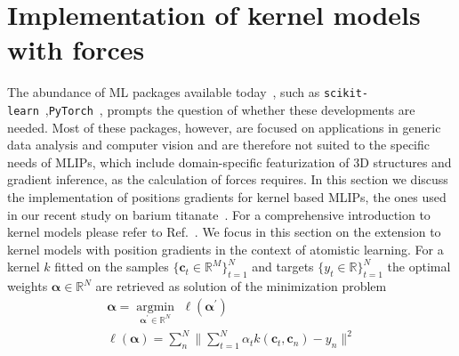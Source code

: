 \section{Implementation of kernel models with forces}
The abundance of ML packages available today~\cite{Haddad2023Artificial}, such as \texttt{scikit-learn}~\cite{pedregosa2011scikit},\linebreak \texttt{PyTorch}~\cite{NEURIPS2019_9015}, prompts the question of whether these developments are needed. %
Most of these packages, however, are focused on applications in generic data analysis and computer vision and are therefore not suited to the specific needs of MLIPs, which include domain-specific featurization of 3D structures and gradient inference, as the calculation of forces requires. %
In this section we discuss the implementation of positions gradients for kernel based MLIPs, the ones used in our recent study on barium titanate~\cite{gigli2023modeling}.
For a comprehensive introduction to kernel models please refer to Ref.~\cite{bishop2006pattern}. 
We focus in this section on the extension to kernel models with position gradients in the context of atomistic learning.
For a kernel $k$ fitted on the samples $\{\mathbf{c}_t\in\mathbb{R}^M\}_{t=1}^N$ and targets $\{y_t\in\mathbb{R}\}_{t=1}^N$ the optimal weights $\boldsymbol{\alpha}\in\mathbb{R}^N$ are retrieved as solution of the minimization problem
\begin{subequations}
  \label{eq:minkernel}
  \begin{gather}
    \boldsymbol{\alpha} = \underset{\boldsymbol{\alpha}^\prime\in\mathbb{R}^N}{{\operatorname{argmin}}}\,\, \ell(\boldsymbol{\alpha}^\prime)\\
    \ell(\boldsymbol{\alpha}) = \sum_{n}^N\| \sum_{t=1}^N \alpha_t k(\mathbf{c}_t, \mathbf{c}_{n}) - y_{n}\|^2
  \end{gather}
\end{subequations}
